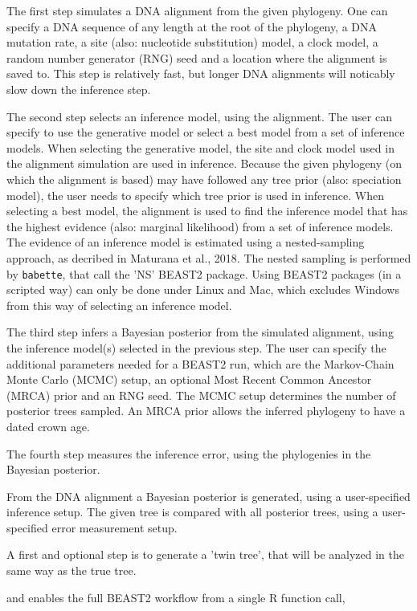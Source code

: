 \documentclass{article}
\begin{document}
The first step simulates a DNA alignment from the given phylogeny.
One can specify a DNA sequence
of any length at the root of the phylogeny, a DNA mutation rate, a
site (also: nucleotide substitution) model, 
a clock model, a random number generator (RNG) seed and a location
where the alignment is saved to. This step is relatively fast, but longer
DNA alignments will noticably slow down the inference step.

The second step selects an inference model, using the alignment.
The user can specify to use the generative model or select a best model
from a set of inference models. 
When selecting the generative model,
the site and clock model used in the alignment simulation are used
in inference. Because the given phylogeny (on which the alignment is based)
may have followed any tree prior (also: speciation model), the user needs
to specify which tree prior is used in inference. 
When selecting a best
model, the alignment is used to find the inference model that has the
highest evidence (also: marginal likelihood) from a set of inference models.
The evidence of an inference model is estimated using a nested-sampling
approach, as decribed in Maturana et al., 2018. The nested sampling is
performed by \verb;babette;, that call the 'NS' BEAST2 package. 
Using BEAST2 packages (in a scripted way) can only be done under Linux and Mac,
which excludes Windows from this way of selecting an inference model.

The third step infers a Bayesian posterior from the simulated alignment,
using the inference model(s) selected in the previous step. The user
can specify the additional parameters needed for a BEAST2 run, which
are the Markov-Chain Monte Carlo (MCMC) setup, 
an optional Most Recent Common Ancestor (MRCA) prior and an RNG seed.
The MCMC setup determines the number of posterior trees sampled.
An MRCA prior allows the inferred phylogeny to have a dated crown age.

The fourth step measures the inference error, using the phylogenies in the
Bayesian posterior.

From the
DNA alignment a Bayesian posterior is generated, using a user-specified
inference setup. The given tree is compared with all posterior trees, using
a user-specified error measurement setup.


A first and optional step is to generate a 'twin tree', that will be
analyzed in the same way as the true tree.

and enables the full BEAST2 workflow from a single R function call,
\end{document}
